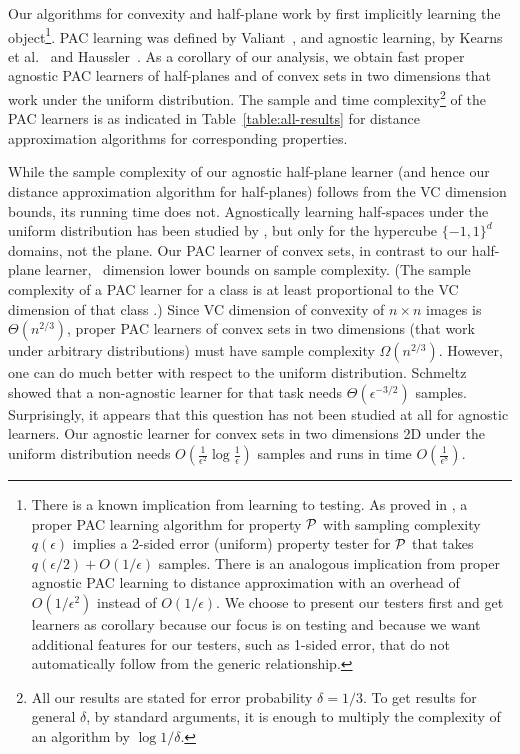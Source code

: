 \documentclass[11pt,english]{article}
\numberwithin{figure}{section}
\newcommand{\eps}{{\epsilon}}
\newcommand{\mydelta}{\epsilon} \newcommand{\bigdelta}{{\epsilon_0}} \newcommand{\dsquares}{d_{\rm squares}}
\begin{document}
Our algorithms for convexity and half-plane work by first implicitly learning the object\footnote{\label{fn:connection-to-learning}There is a known implication from learning to testing. As proved in \cite{GGR98}, a proper PAC learning algorithm for property ${\cal P}$
with sampling complexity $q(\eps)$ implies a 2-sided error (uniform) property tester for $\cal{P}$ that takes $q(\eps/2) + O(1/\eps)$ samples. There is an analogous implication from proper agnostic PAC learning to distance approximation with an overhead of $O(1/\eps^2)$ instead of $O(1/\eps)$. We choose to present our testers first and get learners as corollary because our focus is on testing and because we want additional features for our testers, such as 1-sided error, that do not automatically follow from the generic relationship.}.
\ifnum{}
PAC learning was defined by Valiant~\cite{Valiant84}, and agnostic learning, by Kearns et al.~\cite{KearnsSS94} and Haussler~\cite{Haussler92}.
\fi
 As a corollary of our analysis, we obtain fast proper agnostic PAC learners of half-planes and of convex sets in two dimensions that work under the uniform distribution.
The sample and time complexity\footnote{All our results are stated for error probability $\delta=1/3$. To get results for general $\delta$, by standard arguments, it is enough to multiply the complexity of an algorithm by $\log 1/\delta$.} of the PAC learners is as indicated in Table~\ref{table:all-results} for distance approximation algorithms for corresponding properties.



While the sample complexity of our agnostic half-plane learner (and hence our distance approximation algorithm for half-planes) follows from the VC dimension bounds, its running time does not. Agnostically learning half-spaces under the uniform distribution has been studied by \cite{KalaiKMS08}, but only for the hypercube $\{-1,1\}^d$ domains, not the plane.
Our PAC learner of convex sets, in contrast to our half-plane learner, \ dimension lower bounds on sample complexity. (The sample complexity of a PAC learner for a class
is at least proportional to the VC dimension of that class \cite{EHKV89}.) Since VC dimension of convexity of $n\times n$ images is
$\Theta(n^{2/3})$,
proper PAC learners of convex sets in two dimensions (that work under arbitrary distributions) must have sample complexity $\Omega(n^{2/3})$. However, one can do much better with respect to the uniform distribution.
Schmeltz~\cite{Sch92} showed that a non-agnostic learner for that task needs
$\Theta(\mydelta^{-3/2})$ samples.
Surprisingly, it appears that this question has not been studied at all for agnostic learners. Our agnostic learner for convex sets in
\ifnum{}
two dimensions
\else
2D
\fi
under the uniform distribution needs
$O\left(\frac 1 {\mydelta^2} \log \frac 1 \mydelta\right)$ samples and runs in time $O\left(\frac 1 {\mydelta^8} \right)$.
\end{document}
